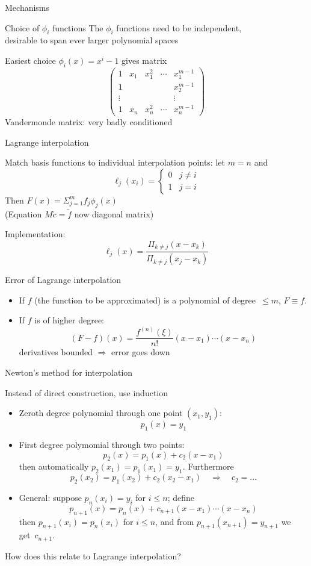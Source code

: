  {Mechanisms}

 {Choice of $\phi_i$ functions}
  The $\phi_i$ functions need to be independent,\\
  desirable to span ever larger polynomial spaces

  Easiest choice $\phi_i(x)=x^i-1$ gives matrix
  \[
  \left(\begin{matrix}
    1&x_1&x_1^2&\cdots&x_1^{m-1}\\ 1&&&&x_2^{m-1}\\ \vdots&&&&\vdots\\
    1&x_n&x_n^2&\cdots&x_n^{m-1}
  \end{matrix}\right)
  \]
  Vandermonde matrix: very badly conditioned

 {Lagrange interpolation}
  
  Match basis functions to individual interpolation points: let $m=n$ and
  \[ \ell_j(x_i)=
    \begin{cases}
      0&j\not=i\\ 1&j=i
    \end{cases}
  \]
  Then $F(x)=\Sigma_{j=1}^m f_j\phi_j(x)$\\
  (Equation $M\utilde c=\utilde f$ now diagonal matrix)

  Implementation:
  \[ \ell_j(x)=\frac{\Pi_{k\not=j}(x-x_k)}{\Pi_{k\not=j}(x_j-x_k)} \]


 {Error of Lagrange interpolation}

  \begin{itemize}
  \item If $f$ (the function to be approximated) is a polynomial of
    degree~$\leq m$, $F\equiv f$.
  \item If $f$ is of higher degree:
    \[ (F-f)(x)=\frac{f^{(n)}(\xi)}{n!}(x-x_1)\cdots(x-x_n) \]
    derivatives bounded $\Rightarrow$ error goes down
  \end{itemize}


 {Newton's method for interpolation}

Instead of direct construction, use induction
\begin{itemize}
\item Zeroth degree polynomial through one point $(x_1,y_1)$:
\[ p_1(x)=y_1 \]
\item First degree polymomial through two points:
\[ p_2(x) = p_1(x)+c_2(x-x_1) \]
then automatically $p_2(x_1) = p_1(x_1)=y_1$. Furthermore
\[ p_2(x_2)=p_1(x_2)+c_2(x_2-x_1)\quad\Rightarrow\quad c_2=\ldots \]
\item General: suppose $p_n(x_i)=y_i$ for $i\leq n$; define
\[ p_{n+1}(x)=p_n(x)+c_{n+1}(x-x_1)\cdots(x-x_n) \]
then $p_{n+1}(x_i)=p_n(x_i)$ for $i\leq n$, and
from $p_{n+1}(x_{n+1})=y_{n+1}$ we get~$c_{n+1}$.
\end{itemize}
How does this relate to Lagrange interpolation?


